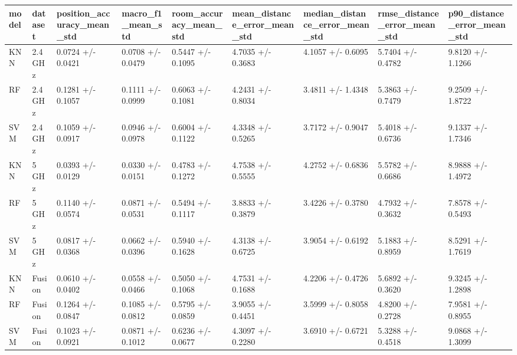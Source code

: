 \begin{tabular}{lllllllll}
\toprule
model & dataset & position_accuracy_mean_std & macro_f1_mean_std & room_accuracy_mean_std & mean_distance_error_mean_std & median_distance_error_mean_std & rmse_distance_error_mean_std & p90_distance_error_mean_std \\
\midrule
KNN & 2.4 GHz & 0.0724 +/- 0.0421 & 0.0708 +/- 0.0479 & 0.5447 +/- 0.1095 & 4.7035 +/- 0.3683 & 4.1057 +/- 0.6095 & 5.7404 +/- 0.4782 & 9.8120 +/- 1.1266 \\
RF & 2.4 GHz & 0.1281 +/- 0.1057 & 0.1111 +/- 0.0999 & 0.6063 +/- 0.1081 & 4.2431 +/- 0.8034 & 3.4811 +/- 1.4348 & 5.3863 +/- 0.7479 & 9.2509 +/- 1.8722 \\
SVM & 2.4 GHz & 0.1059 +/- 0.0917 & 0.0946 +/- 0.0978 & 0.6004 +/- 0.1122 & 4.3348 +/- 0.5265 & 3.7172 +/- 0.9047 & 5.4018 +/- 0.6736 & 9.1337 +/- 1.7346 \\
KNN & 5 GHz & 0.0393 +/- 0.0129 & 0.0330 +/- 0.0151 & 0.4783 +/- 0.1272 & 4.7538 +/- 0.5555 & 4.2752 +/- 0.6836 & 5.5782 +/- 0.6686 & 8.9888 +/- 1.4972 \\
RF & 5 GHz & 0.1140 +/- 0.0574 & 0.0871 +/- 0.0531 & 0.5494 +/- 0.1117 & 3.8833 +/- 0.3879 & 3.4226 +/- 0.3780 & 4.7932 +/- 0.3632 & 7.8578 +/- 0.5493 \\
SVM & 5 GHz & 0.0817 +/- 0.0368 & 0.0662 +/- 0.0396 & 0.5940 +/- 0.1628 & 4.3138 +/- 0.6725 & 3.9054 +/- 0.6192 & 5.1883 +/- 0.8959 & 8.5291 +/- 1.7619 \\
KNN & Fusion & 0.0610 +/- 0.0402 & 0.0558 +/- 0.0466 & 0.5050 +/- 0.1068 & 4.7531 +/- 0.1688 & 4.2206 +/- 0.4726 & 5.6892 +/- 0.3620 & 9.3245 +/- 1.2898 \\
RF & Fusion & 0.1264 +/- 0.0847 & 0.1085 +/- 0.0812 & 0.5795 +/- 0.0859 & 3.9055 +/- 0.4451 & 3.5999 +/- 0.8058 & 4.8200 +/- 0.2728 & 7.9581 +/- 0.8955 \\
SVM & Fusion & 0.1023 +/- 0.0921 & 0.0871 +/- 0.1012 & 0.6236 +/- 0.0677 & 4.3097 +/- 0.2280 & 3.6910 +/- 0.6721 & 5.3288 +/- 0.4518 & 9.0868 +/- 1.3099 \\
\bottomrule
\end{tabular}

